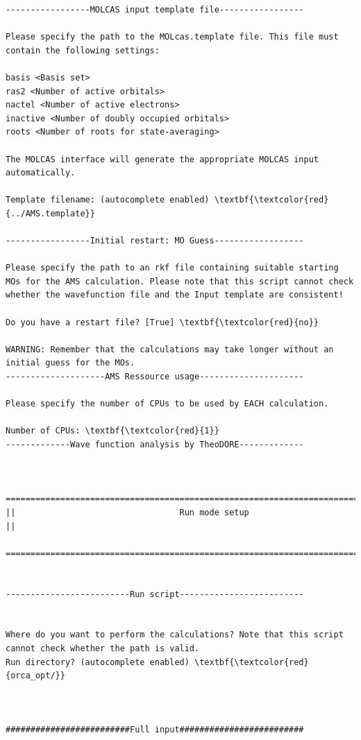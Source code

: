 \documentclass[a4paper,11pt,DIV=15,openany]{scrbook}
\begin{document}
\begin{oframed}
\begin{Verbatim}[commandchars=\\\{\}]
-----------------MOLCAS input template file-----------------

Please specify the path to the MOLcas.template file. This file must contain the following settings:

basis <Basis set>
ras2 <Number of active orbitals>
nactel <Number of active electrons>
inactive <Number of doubly occupied orbitals>
roots <Number of roots for state-averaging>

The MOLCAS interface will generate the appropriate MOLCAS input automatically.

Template filename: (autocomplete enabled) \textbf{\textcolor{red}{../AMS.template}}

-----------------Initial restart: MO Guess------------------

Please specify the path to an rkf file containing suitable starting MOs for the AMS calculation. Please note that this script cannot check whether the wavefunction file and the Input template are consistent!

Do you have a restart file? [True] \textbf{\textcolor{red}{no}}

WARNING: Remember that the calculations may take longer without an initial guess for the MOs.
--------------------AMS Ressource usage---------------------

Please specify the number of CPUs to be used by EACH calculation.

Number of CPUs: \textbf{\textcolor{red}{1}}
-------------Wave function analysis by TheoDORE-------------


  ================================================================================
||                                 Run mode setup                                 ||
  ================================================================================


-------------------------Run script-------------------------


Where do you want to perform the calculations? Note that this script cannot check whether the path is valid.
Run directory? (autocomplete enabled) \textbf{\textcolor{red}{orca_opt/}}



#########################Full input#########################


\end{Verbatim}
\end{oframed}
\end{document}
